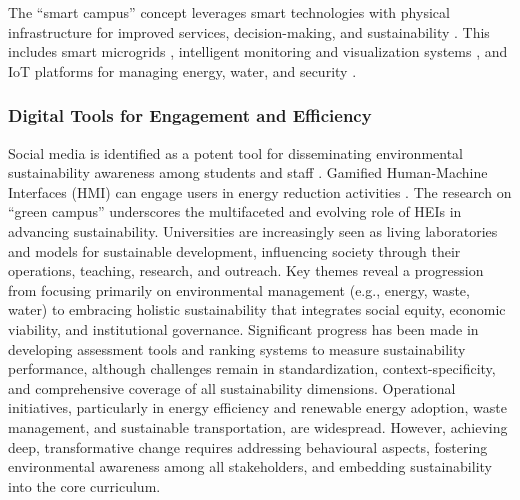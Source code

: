 \documentclass[12pt,a4paper]{article}
\begin{document}
The ``smart campus'' concept leverages smart technologies with physical infrastructure for improved services, decision-making, and sustainability \citep{MinAllah2020, Ahmed2023, Alalawi2024, Sugiarto2022}. This includes smart microgrids \citep{MinAllah2020}, intelligent monitoring and visualization systems \citep{Ceccarini2021}, and IoT platforms for managing energy, water, and security \citep{Subbarao2019, Sanat2024, Alalawi2024}.

\subsubsection{Digital Tools for Engagement and Efficiency}

Social media is identified as a potent tool for disseminating environmental sustainability awareness among students and staff \citep{Hamid2017}. Gamified Human-Machine Interfaces (HMI) can engage users in energy reduction activities \citep{Mendez2021}. The research on ``green campus'' underscores the multifaceted and evolving role of HEIs in advancing sustainability. Universities are increasingly seen as living laboratories and models for sustainable development, influencing society through their operations, teaching, research, and outreach. Key themes reveal a progression from focusing primarily on environmental management (e.g., energy, waste, water) to embracing holistic sustainability that integrates social equity, economic viability, and institutional governance. Significant progress has been made in developing assessment tools and ranking systems to measure sustainability performance, although challenges remain in standardization, context-specificity, and comprehensive coverage of all sustainability dimensions. Operational initiatives, particularly in energy efficiency and renewable energy adoption, waste management, and sustainable transportation, are widespread. However, achieving deep, transformative change requires addressing behavioural aspects, fostering environmental awareness among all stakeholders, and embedding sustainability into the core curriculum.
\end{document}
